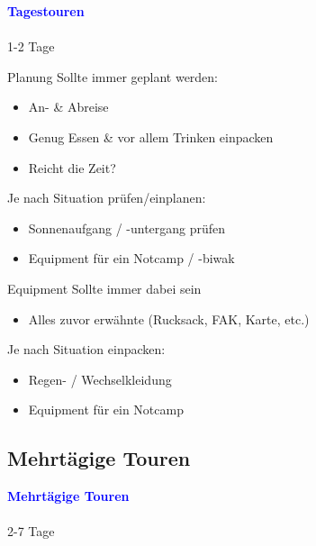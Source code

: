 \documentclass[aspectratio=169]{beamer}
\begin{document}
			\begin{frame}
				\vspace{1cm}
				\begin{center}
					\textcolor{blue}{\textbf{Tagestouren}}
					\\\,\\
					{\scriptsize 1-2 Tage}
				\end{center}
			\end{frame}
			
			\begin{frame}{Planung}
				Sollte immer geplant werden:
				\begin{itemize}
					\item An- \& Abreise
					\item Genug Essen \& vor allem Trinken einpacken
					\item Reicht die Zeit?
				\end{itemize}
				Je nach Situation prüfen/einplanen:
				\begin{itemize}
					\item Sonnenaufgang / -untergang prüfen
					\item Equipment für ein Notcamp / -biwak
				\end{itemize}
			\end{frame}
			
			\begin{frame}{Equipment}
				Sollte immer dabei sein
				\begin{itemize}
					\item Alles zuvor erwähnte (Rucksack, FAK, Karte, etc.)
				\end{itemize}
				Je nach Situation einpacken:
				\begin{itemize}
					\item Regen- / Wechselkleidung
					\item Equipment für ein Notcamp
				\end{itemize}
			\end{frame}
			
		\subsection{Mehrtägige Touren}
		
			\begin{frame}
				\vspace{1cm}
				\begin{center}
					\textcolor{blue}{\textbf{Mehrtägige Touren}}
					\\\,\\
					{\scriptsize 2-7 Tage}
				\end{center}
			\end{frame}
		
\end{document}
